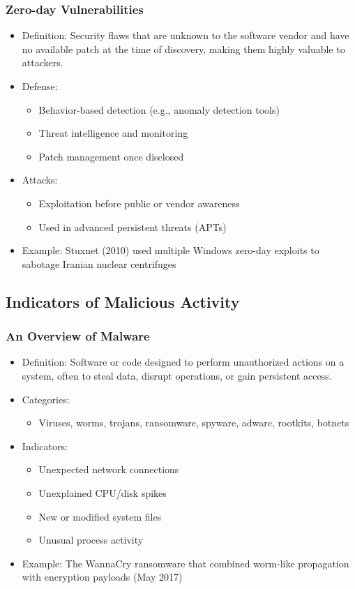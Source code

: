 \documentclass[11pt]{article}
\begin{document}
\subsubsection{Zero-day Vulnerabilities}
\label{sec:org2a40afb}
\begin{itemize}
\item Definition: Security flaws that are unknown to the software vendor and have no available patch at the time of discovery, making them highly valuable to attackers.
\item Defense:
\begin{itemize}
\item Behavior-based detection (e.g., anomaly detection tools)
\item Threat intelligence and monitoring
\item Patch management once disclosed
\end{itemize}
\item Attacks:
\begin{itemize}
\item Exploitation before public or vendor awareness
\item Used in advanced persistent threats (APTs)
\end{itemize}
\item Example: Stuxnet (2010) used multiple Windows zero-day exploits to sabotage Iranian nuclear centrifuges
\end{itemize}
\subsection{Indicators of Malicious Activity}
\label{sec:org18c77ca}
\subsubsection{An Overview of Malware}
\label{sec:org8dd6f5a}
\begin{itemize}
\item Definition: Software or code designed to perform unauthorized actions on a system, often to steal data, disrupt operations, or gain persistent access.
\item Categories:
\begin{itemize}
\item Viruses, worms, trojans, ransomware, spyware, adware, rootkits, botnets
\end{itemize}
\item Indicators:
\begin{itemize}
\item Unexpected network connections
\item Unexplained CPU/disk spikes
\item New or modified system files
\item Unusual process activity
\end{itemize}
\item Example: The WannaCry ransomware that combined worm-like propagation with encryption payloads (May 2017)
\end{itemize}
\end{document}

